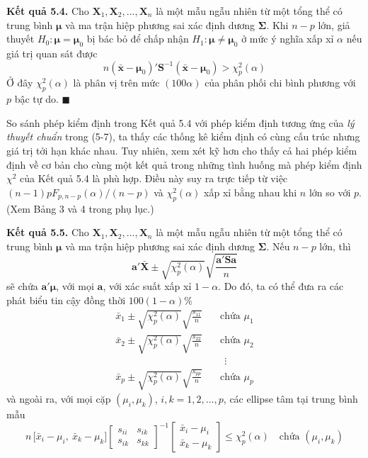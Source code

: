 \medskip
\noindent\textbf{Kết quả 5.4.} Cho $\mathbf{X}_1, \mathbf{X}_2, \dots, \mathbf{X}_n$ là một mẫu ngẫu nhiên từ một tổng thể có trung bình $\boldsymbol{\mu}$ và ma trận hiệp phương sai xác định dương $\boldsymbol{\Sigma}$. Khi $n-p$ lớn, giả thuyết $H_0\colon \boldsymbol{\mu}=\boldsymbol{\mu}_0$ bị bác bỏ để chấp nhận $H_1\colon \boldsymbol{\mu}\neq\boldsymbol{\mu}_0$ ở mức ý nghĩa xấp xỉ $\alpha$ nếu giá trị quan sát được
\[
    n(\bar{\mathbf{x}}-\boldsymbol{\mu}_0)'\mathbf{S}^{-1}(\bar{\mathbf{x}}-\boldsymbol{\mu}_0) > \chi_p^2(\alpha)
\]
Ở đây $\chi_p^2(\alpha)$ là phân vị trên mức $(100\alpha)$ của phân phối chi bình phương với $p$ bậc tự do. \hfill$\blacksquare$

\medskip
So sánh phép kiểm định trong Kết quả 5.4 với phép kiểm định tương ứng của \emph{lý thuyết chuẩn} trong (5-7), ta thấy các thống kê kiểm định có cùng cấu trúc nhưng giá trị tới hạn khác nhau. Tuy nhiên, xem xét kỹ hơn cho thấy cả hai phép kiểm định về cơ bản cho cùng một kết quả trong những tình huống mà phép kiểm định $\chi^2$ của Kết quả 5.4 là phù hợp. Điều này suy ra trực tiếp từ việc $(n-1)pF_{p,n-p}(\alpha)/(n-p)$ và $\chi_p^2(\alpha)$ xấp xỉ bằng nhau khi $n$ lớn so với $p$. (Xem Bảng 3 và 4 trong phụ lục.)

\medskip
\noindent\textbf{Kết quả 5.5.} Cho $\mathbf{X}_1, \mathbf{X}_2, \dots, \mathbf{X}_n$ là một mẫu ngẫu nhiên từ một tổng thể có trung bình $\boldsymbol{\mu}$ và ma trận hiệp phương sai xác định dương $\boldsymbol{\Sigma}$. Nếu $n-p$ lớn, thì
\[
    \mathbf{a}'\bar{\mathbf{X}} \pm \sqrt{\chi_p^2(\alpha)}\sqrt{\frac{\mathbf{a}'\mathbf{S}\mathbf{a}}{n}}
\]
sẽ chứa $\mathbf{a}'\boldsymbol{\mu}$, với mọi $\mathbf{a}$, với xác suất xấp xỉ $1-\alpha$. Do đó, ta có thể đưa ra các phát biểu tin cậy đồng thời $100(1-\alpha)\%$
\begin{align*}
    \bar{x}_1 \pm \sqrt{\chi_p^2(\alpha)}\sqrt{\frac{s_{11}}{n}} \quad &\text{chứa } \mu_1 \\
    \bar{x}_2 \pm \sqrt{\chi_p^2(\alpha)}\sqrt{\frac{s_{22}}{n}} \quad &\text{chứa } \mu_2 \\
    &\ \ \vdots \\
    \bar{x}_p \pm \sqrt{\chi_p^2(\alpha)}\sqrt{\frac{s_{pp}}{n}} \quad &\text{chứa } \mu_p
\end{align*}
và ngoài ra, với mọi cặp $(\mu_i, \mu_k)$, $i,k=1,2,\dots,p$, các ellipse tâm tại trung bình mẫu
\[
    n\,\bigl[\bar{x}_i-\mu_i,\ \bar{x}_k-\mu_k\bigr]
    \begin{bmatrix} s_{ii} & s_{ik} \\ s_{ik} & s_{kk} \end{bmatrix}^{-1}
    \begin{bmatrix}\bar{x}_i-\mu_i \\ \bar{x}_k-\mu_k\end{bmatrix}
    \le \chi_p^2(\alpha) \quad \text{chứa } (\mu_i, \mu_k)
\]

